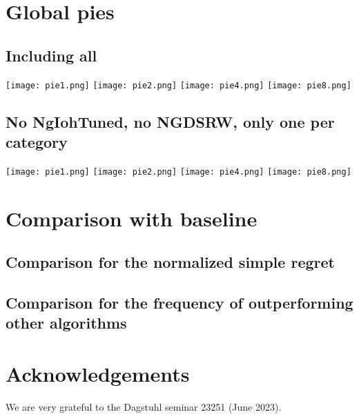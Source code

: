 

\section{Global pies}

\subsection{Including all}
\texttt{[image: pie1.png]}
\texttt{[image: pie2.png]}
\texttt{[image: pie4.png]}
\texttt{[image: pie8.png]}
\subsection{No NgIohTuned, no NGDSRW, only one per category}
\texttt{[image: pie1.png]}
\texttt{[image: pie2.png]}
\texttt{[image: pie4.png]}
\texttt{[image: pie8.png]}


\section{Comparison with baseline}
\subsection{Comparison for the normalized simple regret}

\subsection{Comparison for the frequency of outperforming other algorithms}


\section*{Acknowledgements}
We are very grateful to the Dagstuhl seminar 23251 (June 2023).%




